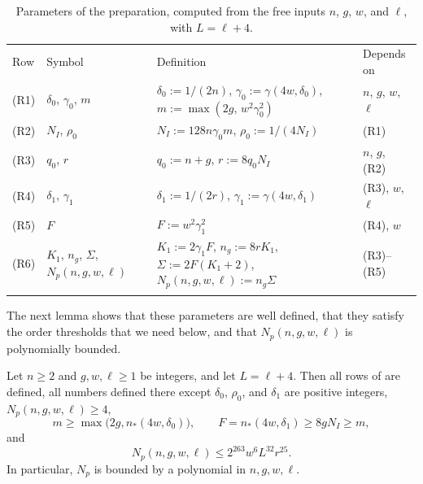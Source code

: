 \documentclass[fontsize=12pt,leading=14pt]{fullpaper}
\begin{document}
\begin{table}[htbp]
  \centering
  \small
  \renewcommand{\arraystretch}{1.15}
  \begin{tabular}{@{}p{}p{}p{}p{}@{}}
    \hline\noalign{\smallskip}
    Row & Symbol & Definition & Depends on \\
    \noalign{\smallskip}\hline\noalign{\smallskip}
    (R1) & $\delta_0$, $\gamma_0$, $m$ & \raggedright $\delta_0:=1/(2n)$, $\gamma_0:=\gamma(4w,\delta_0)$, $m:=\max(2g,\,w^2\gamma_0^2)$ & $n$, $g$, $w$, $\ell$ \\[2pt]
    (R2) & $N_I$, $\rho_0$ & $N_I:=128n\gamma_0m$, $\rho_0:=1/(4N_I)$ & (R1) \\[2pt]
    (R3) & $q_0$, $r$ & $q_0:=n+g$, $r:=8q_0N_I$ & $n$, $g$, (R2) \\[2pt]
    (R4) & $\delta_1$, $\gamma_1$ & \raggedright $\delta_1:=1/(2r)$, $\gamma_1:=\gamma(4w,\delta_1)$ & (R3), $w$, $\ell$ \\[2pt]
    (R5) & $F$ & $F:=w^2\gamma_1^2$ & (R4), $w$ \\[2pt]
    (R6) & \raggedright $K_1$, $n_g$, $\Sigma$, $N_p(n,g,w,\ell)$ & \raggedright $K_1:=2\gamma_1F$, $n_g:=8rK_1$, $\Sigma:=2F(K_1+2)$, $N_p(n,g,w,\ell):=n_g\Sigma$ & (R3)--(R5) \\
    \noalign{\smallskip}\hline
  \end{tabular}
  \caption{Parameters of the preparation, computed from the free inputs $n$, $g$, $w$, and $\ell$, with $L=\ell+4$.}
  \label{tab:prep-params}
\end{table}

The next lemma shows that these parameters are well defined, that they satisfy the order thresholds that we need below, and that $N_p(n,g,w,\ell)$ is polynomially bounded.

\begin{lemma}\label{lem:prep-size}
  Let $n\ge2$ and $g,w,\ell\ge1$ be integers, and let $L=\ell+4$.
  Then all rows of  are defined, all numbers defined there except $\delta_0$, $\rho_0$, and $\delta_1$ are positive integers, $N_p(n,g,w,\ell)\ge4$,
  \begin{equation}\label{eq:prep-thresholds}
    m\ge\max\bigl(2g,n_*(4w,\delta_0)\bigr),\qquad
    F=n_*(4w,\delta_1)\ge8gN_I\ge m,
  \end{equation}
  and
  \begin{equation}\label{eq:prep-size}
    N_p(n,g,w,\ell)\le2^{263}w^6L^{32}r^{25}.
  \end{equation}
  In particular, $N_p$ is bounded by a polynomial in $n,g,w,\ell$.
\end{lemma}
\end{document}
